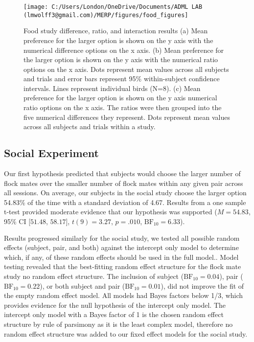 \documentclass[
  english,
  ,doc,floatsintext]{apa6}
\begin{document}
\begin{figure}

{\centering \texttt{[image: C:/Users/London/OneDrive/Documents/ADML LAB (lmwolff3@gmail.com)/MERP/figures/food\_figures]} 

}

\caption{Food study difference, ratio, and interaction results (a) Mean preference for the larger option is shown on the y axis with the numerical difference options on the x axis. (b) Mean preference for the larger option is shown on the y axis with the numerical ratio options on the x axis. Dots represent mean values across all subjects and trials and error bars represent 95\% within-subject confidence intervals. Lines represent individual birds (N=8). (c) Mean preference for the larger option is shown on the y axis numerical ratio options on the x axis. The ratios were then grouped into the five numerical differences they represent. Dots represent mean values across all subjects and trials within a study.}\label{fig:foodgraphs}
\end{figure}

\hypertarget{social-experiment-1}{%
\subsection{Social Experiment}\label{social-experiment-1}}

Our first hypothesis predicted that subjects would choose the larger number of flock mates over the smaller number of flock mates within any given pair across all sessions. On average, our subjects in the social study choose the larger option 54.83\% of the time with a standard deviation of 4.67. Results from a one sample t-test provided moderate evidence that our hypothesis was supported (\(M = 54.83\), 95\% CI \([51.48\), \(58.17]\), \(t(9) = 3.27\), \(p = .010\), \(\mathrm{BF}_{\textrm{10}} = 6.33\)).

Results progressed similarly for the social study, we tested all possible random effects (subject, pair, and both) against the intercept only model to determine which, if any, of these random effects should be used in the full model.. Model testing revealed that the best-fitting random effect structure for the flock mate study no random effect structure. The inclusion of subject (\(\mathrm{BF}_{\textrm{10}} = 0.04\)), pair (\(\mathrm{BF}_{\textrm{10}} = 0.22\)), or both subject and pair (\(\mathrm{BF}_{\textrm{10}} = 0.01\)), did not improve the fit of the empty random effect model. All models had Bayes factors below 1/3, which provides evidence for the null hypothesis of the intercept only model. The intercept only model with a Bayes factor of 1 is the chosen random effect structure by rule of parsimony as it is the least complex model, therefore no random effect structure was added to our fixed effect models for the social study.
\end{document}
